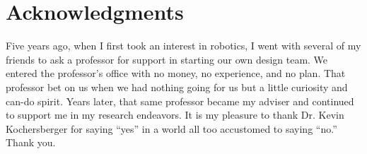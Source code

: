 \chapter*{Acknowledgments}

Five years ago, when I first took an interest in robotics, I went with several of my friends to ask a professor for support in starting our own design team. We entered the professor's office with no money, no experience, and no plan. That professor bet on us when we had nothing going for us but a little curiosity and can-do spirit. Years later, that same professor became my adviser and continued to support me in my research endeavors. It is my pleasure to thank Dr. Kevin Kochersberger for saying ``yes'' in a world all too accustomed to saying ``no.'' Thank you.